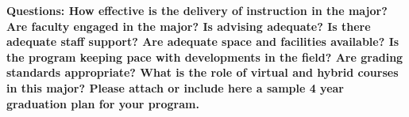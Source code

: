 \documentclass[12pt]{article}
\begin{document}
{\bf Questions: How effective is the delivery of instruction in the
  major? Are faculty engaged in the major? Is advising adequate? Is
  there adequate staff support? Are adequate space and facilities
  available? Is the program keeping pace with developments in the
  field? Are grading standards appropriate? What is the role of
  virtual and hybrid courses in this major? Please attach or include
  here a sample 4 year graduation plan for your program.}\\[3pt]

\end{document}
